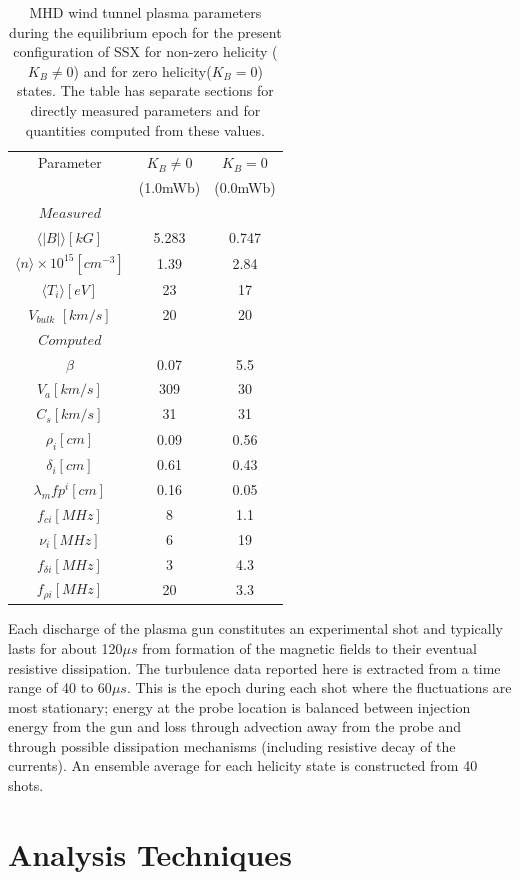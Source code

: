 \documentclass[aip,prl,amsmath,amssymb,reprint,superscriptaddress]{revtex4-1} %
\begin{document}
\begin{table}
\caption{\label{tab:params}MHD wind tunnel plasma parameters during the equilibrium epoch for the present configuration of SSX for non-zero helicity ($K_{B}\neq 0$) and for zero helicity($K_{B}=0$) states. The table has separate sections for directly measured parameters and for quantities computed from these values.}
\begin{tabular}{c|cc}
\toprule
Parameter&$K_{B}\neq 0$&$K_{B}=0$\\
				 &(1.0mWb)             &(0.0mWb)\\
\hline
$Measured$&&\\
\hline
$\langle |B|\rangle [kG]$&5.283&0.747\\
$\langle n\rangle \times 10^{15} [cm^{-3}]$&1.39&2.84\\
$\langle T_{i}\rangle [eV]$&23&17\\
$V_{bulk}$ $[km/s]$&20&20\\
\hline
$Computed$&&\\
\hline
$\beta$&0.07&5.5\\
$V_{a} [km/s]$&309&30\\
$C_{s} [km/s]$&31&31\\
$\rho_{i} [cm]$&0.09&0.56\\
$\delta_{i} [cm]$&0.61&0.43\\
$\lambda_mfp^{i} [cm]$&0.16&0.05\\
$f_{ci} [MHz]$&8&1.1\\
$\nu_{i} [MHz]$&6&19\\
$f_{\delta i} [MHz]$&3&4.3\\
$f_{\rho i} [MHz]$&20&3.3\\
\hline
\end{tabular}
\end{table}

Each discharge of the plasma gun constitutes an experimental shot and typically lasts for about 120$\mu s$ from formation of the magnetic fields to their eventual resistive dissipation. The turbulence data reported here is extracted from a time range of 40 to 60$\mu s$. This is the epoch during each shot where the fluctuations are most stationary; energy at the probe location is balanced between injection energy from the gun and loss through advection away from the probe and through possible dissipation mechanisms (including resistive decay of the currents). An ensemble average for each helicity state is constructed from 40 shots.

\section{Analysis Techniques}\label{sec:analysis}
\end{document}
